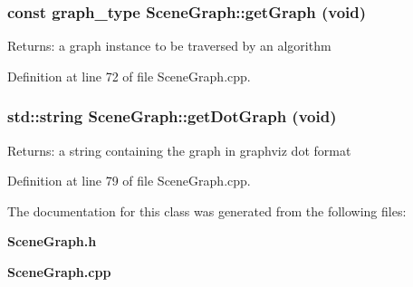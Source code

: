 \subsubsection{\setlength{\rightskip}{0pt plus 5cm}const {\bf graph\_\-type} SceneGraph::getGraph (void)}\label{classSceneGraph_0df0b539245afe403114fab4831c045d}


\begin{Desc}
\item[Returns:]a graph instance to be traversed by an algorithm \end{Desc}




Definition at line 72 of file SceneGraph.cpp.
\subsubsection{\setlength{\rightskip}{0pt plus 5cm}std::string SceneGraph::getDotGraph (void)}\label{classSceneGraph_5eee36560f2b6c1d7b8717feaf46503b}


\begin{Desc}
\item[Returns:]a string containing the graph in graphviz dot format \end{Desc}




Definition at line 79 of file SceneGraph.cpp.

The documentation for this class was generated from the following files:\begin{CompactItemize}
\item 
{\bf SceneGraph.h}\item 
{\bf SceneGraph.cpp}\end{CompactItemize}
